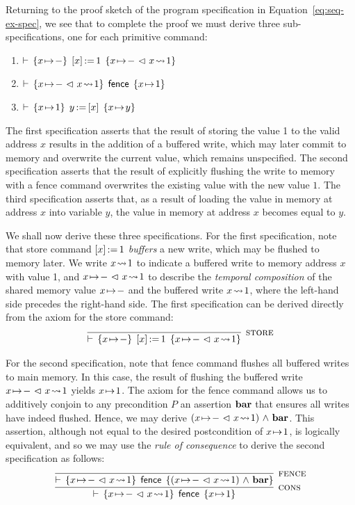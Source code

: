 \documentclass[11pt]{report}
\begin{document}
Returning to the proof sketch of the program specification in Equation~\ref{eq:seq-ex-spec}, we see that to complete the proof we must derive three sub-specifications, one for each primitive command: \begin{enumerate}
  \item $\vdash\,\left\lbrace x \!\mapsto\! - \right\rbrace\;\left[ x \right] \operatorname{:\!=} 1\;\left\lbrace x \!\mapsto\! - \operatorname{\,\vartriangleleft\,} x \!\leadsto\! 1 \right\rbrace$
  \item $\vdash\,\left\lbrace x \!\mapsto\! - \operatorname{\,\vartriangleleft\,} x \!\leadsto\! 1 \right\rbrace\;\operatorname{\mathsf{fence}}\;\left\lbrace x \!\mapsto\! 1 \right\rbrace$
  \item $\vdash\,\left\lbrace x \!\mapsto\! 1 \right\rbrace\;y \operatorname{:\!=} \left[ x \right]\;\left\lbrace x \!\mapsto\! y \right\rbrace$
\end{enumerate}
The first specification asserts that the result of storing the value 1 to the valid address $x$ results in the addition of a buffered write, which may later commit to memory and overwrite the current value, which remains unspecified. The second specification asserts that the result of explicitly flushing the write to memory with a fence command overwrites the existing value with the new value $1$. The third specification asserts that, as a result of loading the value in memory at address $x$ into variable $y$, the value in memory at address $x$ becomes equal to $y$. 

We shall now derive these three specifications. For the first specification, note that store command $\left[ x \right] \operatorname{:\!=} 1$ \emph{buffers} a new write, which may be flushed to memory later. We write $x \!\leadsto\! 1$ to indicate a buffered write to memory address $x$ with value 1, and $x \!\mapsto\! - \operatorname{\,\vartriangleleft\,} x \!\leadsto\! 1$ to describe the \emph{temporal composition} of the shared memory value $x \!\mapsto\! -$ and the buffered write $x \!\leadsto\! 1$, where the left-hand side precedes the right-hand side. The first specification can be derived directly from the axiom for the store command: 
\[ 
\infer[\textsc{store}]{\triple{x \fpointsto -}{\cstore{x}{1}}{x \fpointsto - \fseq x \fwriteu 1}}{}
\]

For the second specification, note that fence command flushes all buffered writes to main memory. In this case, the result of flushing the buffered write $x \!\mapsto\! - \operatorname{\,\vartriangleleft\,} x \!\leadsto\! 1$ yields $x \!\mapsto\! 1$. The axiom for the fence command allows us to additively conjoin to any precondition $P$ an assertion $\mathbf{bar}$ that ensures all writes have indeed flushed. Hence, we may derive $(x \!\mapsto\! - \operatorname{\,\vartriangleleft\,} x \!\leadsto\! 1) \operatorname{\,\wedge\,} \mathbf{bar}$. This assertion, although not equal to the desired postcondition of $x \!\mapsto\! 1$, is logically equivalent, and so we may use the \emph{rule of consequence} to derive the second specification as follows:
\[ 
  \infer[\textsc{cons}]{\triple{x \fpointsto - \fseq x \fwriteu 1}{\cfence}{x \fpointsto 1}}{\infer[\textsc{fence}]{\triple{x \fpointsto - \fseq x \fwriteu 1}{\cfence}{(x \fpointsto - \fseq x \fwriteu 1) \conj \fbaru}}{}}
\]
\end{document}
